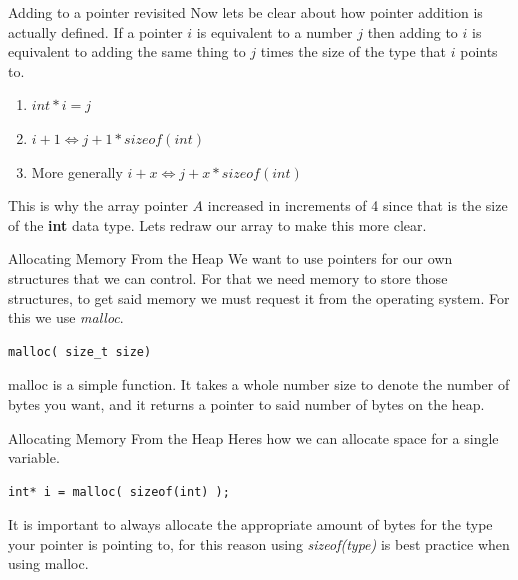 \documentclass{beamer}
\begin{document}
\begin{frame}[fragile]{Adding to a pointer revisited}
Now lets be clear about how pointer addition is actually defined. If a pointer $i$ is equivalent to a number $j$ then adding to $i$ is equivalent to adding the same thing to $j$ times the size of the type that $i$ points to.

\begin{enumerate}
	\item $int* i = j$
	\item $i + 1 \iff j + 1 * sizeof(int)$
	\item More generally $i + x \iff j + x * sizeof(int)$
\end{enumerate}
This is why the array pointer $A$ increased in increments of 4 since that is the size of the {\bf int} data type. Lets redraw our array to make this more clear.
\end{frame}

\begin{frame}[fragile]{Allocating Memory From the Heap}
We want to use pointers for our own structures that we can control. For that we need memory to store those structures, to get said memory we must request it from the operating system. For this we use {\it malloc}.
\begin{verbatim}
malloc( size_t size)
\end{verbatim}
malloc is a simple function. It takes a whole number size to denote the number of bytes you want, and it returns a pointer to said number of bytes on the heap.
\end{frame}

\begin{frame}[fragile]{Allocating Memory From the Heap}
Heres how we can allocate space for a single variable.
\begin{verbatim}
int* i = malloc( sizeof(int) );
\end{verbatim} 
It is important to always allocate the appropriate amount of bytes for the type your pointer is pointing to, for this reason using {\it sizeof(type)} is best practice when using malloc.\\

\end{frame}
\end{document}
